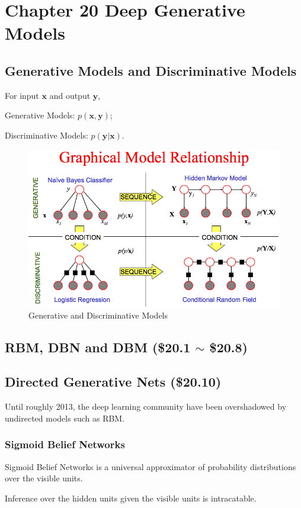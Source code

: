 \documentclass[12pt]{article}
\numberwithin{equation}{section}
\begin{document}
\section{Chapter 20 Deep Generative Models}
\subsection{Generative Models and Discriminative Models\citep{ng2002discriminative}}
	For input $\bm{x}$ and output $\bm{y}$, \par
	Generative Models: $p(\bm{x,y})$; \par
	Discriminative Models: $p(\bm{y|x})$. \par
	\par
	\begin{figure}[H]
		\includegraphics[width=\linewidth]{fig_DL/generative_discriminative_models.png}
		\caption{Generative and Discriminative Models}
		\label{fig:generative_discriminative_models}
	\end{figure}
\subsection{RBM, DBN and DBM (\$20.1 $\sim$ \$20.8)}
\subsection{Directed Generative Nets (\$20.10)}
	Until roughly 2013, the deep learning community have been overshadowed by undirected models such as RBM.
\subsubsection{Sigmoid Belief Networks}
	Sigmoid Belief Networks is a universal approximator of  probability distributions over the visible units.\par
	Inference over the hidden units given the visible units is intracatable.\par
\end{document}
